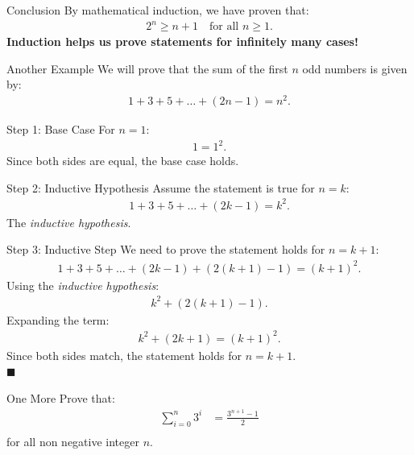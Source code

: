 \documentclass[aspectratio=169]{beamer}
\renewcommand{\qed}{\\ \hfill $\blacksquare$}
\begin{document}
\begin{frame}{Conclusion}
    By mathematical induction, we have proven that:
    \begin{align*}
        2^n \geq n + 1 \quad \text{for all } n \geq 1.
    \end{align*}
    \textbf{Induction helps us prove statements for infinitely many cases!}
\end{frame}

\begin{frame}{Another Example}
    We will prove that the sum of the first $n$ odd numbers is given by:
    \begin{align*}
        1 + 3 + 5 + \dots + (2n - 1) = n^2.
    \end{align*}
\end{frame}

\begin{frame}{Step 1: Base Case}
    For $n = 1$:
    \begin{align*}
        1 = 1^2.
    \end{align*}
    Since both sides are equal, the base case holds. \checkmark
\end{frame}

\begin{frame}{Step 2: Inductive Hypothesis}
  Assume the statement is true for $n = k$:
  \begin{align*}
    1 + 3 + 5 + \dots + (2k - 1) = k^2.
  \end{align*}
  The \textit{inductive hypothesis}.
\end{frame}

\begin{frame}{Step 3: Inductive Step}
    We need to prove the statement holds for $n = k+1$:
    \begin{align*}
        1 + 3 + 5 + \dots + (2k - 1) + (2(k+1) - 1) = (k+1)^2.
    \end{align*}
    \pause
    Using the \textit{inductive hypothesis}:
    \begin{align*}
        k^2 + (2(k+1) - 1).
    \end{align*}
    \pause
    Expanding the term:
    \begin{align*}
        k^2 + (2k + 1) = (k+1)^2.
    \end{align*}
    \pause
    Since both sides match, the statement holds for $n = k+1$.
    \qed
\end{frame}

\begin{frame}{One More}
    Prove that:
    \begin{align*}
        \sum_{i = 0}^n 3^i &= \frac{3^{n + 1} - 1}{2} \\
    \end{align*}
    for all non negative integer $n$.
\end{frame}
\end{document}
